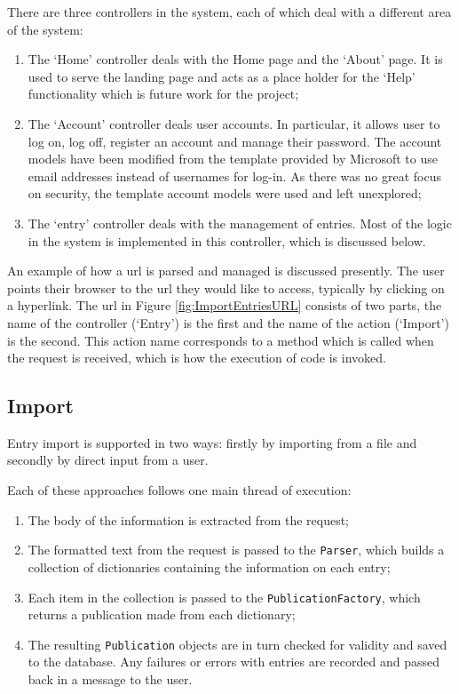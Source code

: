 There are three controllers in the system, each of which deal with a different area of the system:
\begin{enumerate}
	\item The `Home' controller deals with the Home page and the `About' page.  It is used to serve the landing page and acts as a place holder for the `Help' functionality which is future work for the project;
	\item The `Account' controller deals user accounts.  In particular, it allows user to log on, log off, register an account and manage their password.  The account models have been modified from the template provided by Microsoft to use email addresses instead of usernames for log-in.  As there was no great focus on security, the template account models were used and left unexplored;
	\item The `entry' controller deals with the management of \bibtex{} entries.  Most of the logic in the system is implemented in this controller, which is discussed below.
\end{enumerate}

An example of how a \gls{url} is parsed and managed is discussed presently.  The user points their browser to the \gls{url} they would like to access, typically by clicking on a hyperlink.  The \gls{url} in Figure \ref{fig:ImportEntriesURL} consists of two parts, the name of the controller (`Entry') is the first and the name of the action (`Import') is the second.  This action name corresponds to a method which is called when the request is received, which is how the execution of code is invoked.  

\subsection{Import}
Entry import is supported in two ways: firstly by importing from a file and secondly by direct input from a user.

Each of these approaches follows one main thread of execution:
\begin{enumerate}
	\item The body of the information is extracted from the request;
	\item The \bibtex{} formatted text from the request is passed to the \texttt{Parser}, which builds a collection of dictionaries containing the information on each entry;
	\item Each item in the collection is passed to the \texttt{PublicationFactory}, which returns a publication made from each dictionary;
	\item The resulting \texttt{Publication} objects are in turn checked for validity and saved to the database. Any failures or errors with entries are recorded and passed back in a message to the user.
\end{enumerate}

